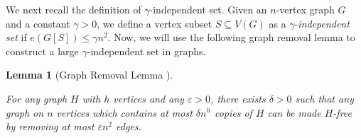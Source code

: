 \documentclass[11pt, a4paper]{article}
\newtheorem{lemma}[theorem]{Lemma}
\newtheorem{proposition}[theorem]{Proposition}
\theoremstyle{definition}
\newcommand{\eps}{\varepsilon}
\newcommand{\<}{\subseteq}
\begin{document}


We next recall the definition of $\gamma$-independent set.  Given an $n$-vertex graph $G$ and a constant $\gamma > 0$, we define a vertex subset $S \subseteq V(G)$ as a $\gamma$-\textit{independent set} if $e(G[S])\leq \gamma n^2$. 
Now, we will use the following graph removal lemma to construct a large $\gamma$-{independent set} in graphs. 
\begin{lemma}[Graph Removal Lemma \cite{ADLR1994}]\label{GRL}

For any graph $H$ with $h$ vertices and any $\eps>0$, there exists $\delta>0$ such that any graph on $n$ vertices which contains at most $\delta n^h$ copies of $H$ can be made $H$-free by removing at most $\eps n^2$ edges.
\end{lemma}
\end{document}
